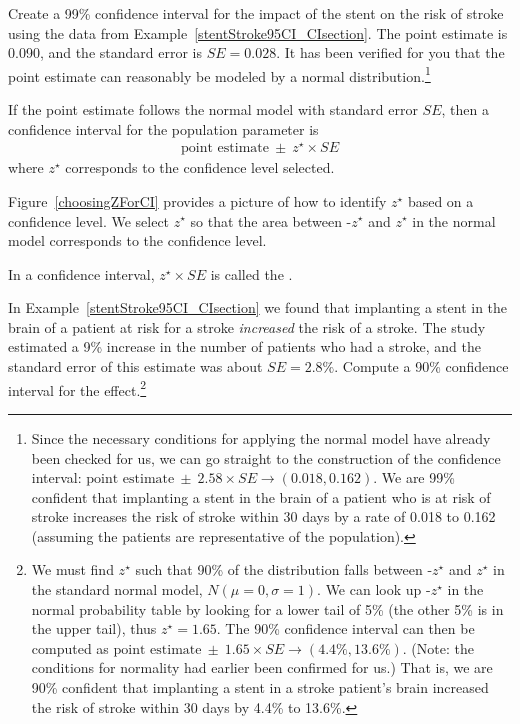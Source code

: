 \begin{exercise} \label{find99CIForRun10AgeExercise}
Create a 99\% confidence interval for the impact of the stent on the risk of stroke using the data from Example~\ref{stentStroke95CI_CIsection}. The point estimate is 0.090, and the standard error is $SE = 0.028$. It has been verified for you that the point estimate can reasonably be modeled by a normal distribution.\footnote{Since the necessary conditions for applying the normal model have already been checked for us, we can go straight to the construction of the confidence interval: $\text{point estimate}\ \pm\ 2.58 \times  SE \rightarrow (0.018, 0.162)$. We are 99\% confident that implanting a stent in the brain of a patient who is at risk of stroke increases the risk of stroke within 30 days by a rate of 0.018 to 0.162 (assuming the patients are representative of the population).}
\end{exercise}

\begin{termBox}{
If the point estimate follows the normal model with standard error $SE$, then a confidence interval for the population parameter is
\begin{eqnarray*}
\text{point estimate}\ \pm\ z^{\star} \times SE
\end{eqnarray*}
where $z^{\star}$ corresponds to the confidence level selected.}
\end{termBox}

Figure~\ref{choosingZForCI} provides a picture of how to identify $z^{\star}$ based on a confidence level. We select $z^{\star}$ so that the area between -$z^{\star}$ and $z^{\star}$ in the normal model corresponds to the confidence level. 

\begin{termBox}{
\label{marginOfErrorTermBox}In a confidence interval, $z^{\star}\times SE$ is called the .}
\end{termBox}

\textA{\pagebreak}

\begin{exercise} \label{find90CIForRun10AgeExercise}
In Example~\ref{stentStroke95CI_CIsection} we found that implanting a stent in the brain of a patient at risk for a stroke \emph{increased} the risk of a stroke. The study estimated a 9\% increase in the number of patients who had a stroke, and the standard error of this estimate was about $SE = 2.8\%$. Compute a 90\% confidence interval for the effect.\footnote{We must find $z^{\star}$ such that 90\% of the distribution falls between -$z^{\star}$ and $z^{\star}$ in the standard normal model, $N(\mu=0, \sigma=1)$. We can look up -$z^{\star}$ in the normal probability table by looking for a lower tail of 5\% (the other 5\% is in the upper tail), thus $z^{\star}=1.65$. The 90\% confidence interval can then be computed as $\text{point estimate}\ \pm\ 1.65\times SE \to (4.4\%, 13.6\%)$. (Note: the conditions for normality had earlier been confirmed for us.) That is, we are 90\% confident that implanting a stent in a stroke patient's brain increased the risk of stroke within 30 days by 4.4\% to 13.6\%.}
\end{exercise}

